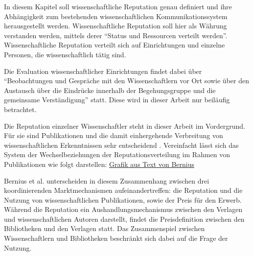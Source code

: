 In diesem Kapitel soll wissenschaftliche Reputation genau definiert und ihre Abhängigkeit zum bestehenden wissenschaftlichen Kommunikationssystem herausgestellt werden. Wissenschaftliche Reputation soll hier als Währung verstanden werden, mittels derer “Status und Ressourcen verteilt werden”\cite{hanekop_2006}. Wissenschaftliche Reputation verteilt sich auf Einrichtungen und einzelne Personen, die wissenschaftlich tätig sind\cite{suchen}. 

Die Evaluation wissenschaftlicher Einrichtungen findet dabei über “Beobachtungen und Gespräche mit den Wissenschaftlern vor Ort sowie über den Austausch über die Eindrücke innerhalb der Begehungsgruppe und die gemeinsame Verständigung”\cite{Barl_sius_2008} statt. Diese wird in dieser Arbeit nur beiläufig betrachtet.

Die Reputation einzelner Wissenschaftler steht in dieser Arbeit im Vordergrund. Für sie sind Publikationen und die damit einhergehende Verbreitung von wissenschaftlichen Erkenntnissen sehr entscheidend \cite{Hess_2006}. Vereinfacht lässt sich das System der Wechselbeziehungen der Reputationsverteilung im Rahmen von Publikationen wie folgt darstellen\cite{cite:21a}: \href{http://www.eap-journal.com/archive/v39_i1_8_bernius.pdf}{Grafik aus Text von Bernius}

Bernius et al. unterscheiden in diesem Zusammenhang zwischen drei koordinierenden Marktmechanismen aufeinandertreffen: die Reputation und die Nutzung von wissenschaftlichen Publikationen, sowie der Preis für den Erwerb. Während die Reputation ein Aushandlungsmechanismus zwischen den Verlagen und wissenschaftlichen Autoren darstellt, findet die Preisdefinition zwischen den Bibliotheken und den Verlagen statt. Das Zusammenspiel zwischen Wissenschaftlern und Bibliotheken beschränkt sich dabei auf die Frage der Nutzung.\cite{cite:21a}

